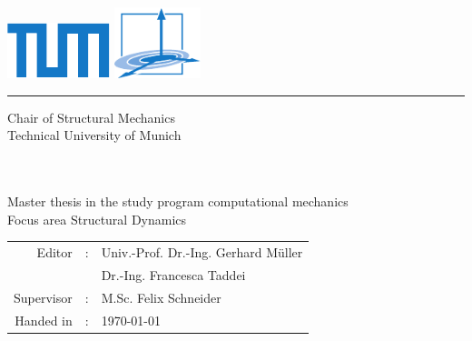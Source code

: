 \begin{titlepage}
	
	\begin{center}
		{
			\fontsize{18}{18}\selectfont 
			
			\includegraphics*[width=3cm, keepaspectratio=true]{bmvorlagen/logos/tumlogo} \hfill \includegraphics*[width=2.5cm, keepaspectratio=true]{bmvorlagen/logos/bmlogo}
			\vspace{0.5cm}
			\hrule
			
			\vspace{1cm}
			Chair of Structural Mechanics\\
			Technical University of Munich\\
			
			\vspace{1.4cm}
			
			\vspace{2cm}
			
			
			\vspace{3mm}
			
			
			
			\bmtitle \\[5ex]
			
			
			\bmauthor \\[7ex]
			
			
			Master thesis in the study program computational mechanics\\
			Focus area Structural Dynamics\\
			
			\vspace{1.8cm}
			
			{\fontsize{12pt}{12} \selectfont%
				\begin{tabular}{rll}
					Editor&:& Univ.-Prof. Dr.-Ing. Gerhard Müller\\
					& & Dr.-Ing. Francesca Taddei\\[0.5ex]
					Supervisor&:& M.Sc. Felix Schneider\\[0.5ex]
					Handed in&:& \today
				\end{tabular}
			}
			
			
		}
	\end{center}
	
\end{titlepage}